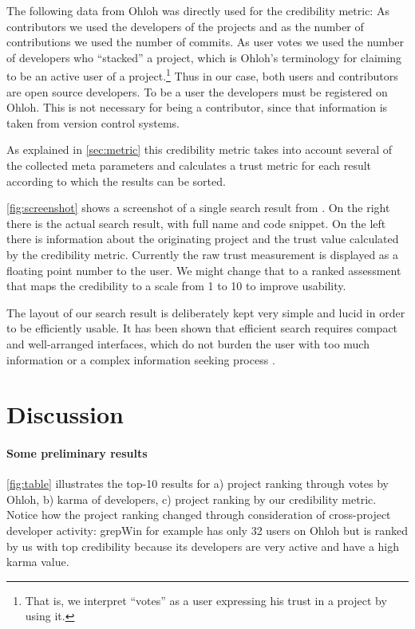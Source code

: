 The following data from Ohloh was directly used for the credibility metric: As contributors we used the developers of the projects and as the number of contributions we used the number of commits. As user votes we used the number of developers who ``stacked'' a project, which is Ohloh's terminology for claiming to be an active user of a project.\footnote{That is, we interpret ``votes'' as a user expressing his trust in a project by using it.} Thus in our case, both users and contributors are open source developers. To be a user the developers must be registered on Ohloh.  This is not necessary for being a contributor, since that information is taken from version control systems.

As explained in \autoref{sec:metric} this credibility metric takes into account several of the collected meta parameters and calculates a trust metric for each result according to which the results can be sorted.

\autoref{fig:screenshot} shows a screenshot of a single search result from \Jbd. On the right there is the actual search result, with full name and code snippet. On the left there is information about the originating project and the trust value calculated by the credibility metric. Currently the raw trust measurement is displayed as a floating point number to the user. We might change that to a ranked assessment that maps the credibility to a scale from 1 to 10 to improve usability. 

The layout of our search result is deliberately kept very simple and lucid in order to be efficiently usable. It has been shown that efficient search requires compact and well-arranged interfaces, which do not burden the user with too much information or a complex information seeking process \cite{Hear09a}. 


\section{Discussion}
\label{sec:discussion}

\paragraph{Some preliminary results}
\autoref{fig:table} illustrates the top-10 results for a) project ranking through votes by Ohloh, b) karma of developers, c) project ranking by our credibility metric. Notice how the project ranking changed through consideration of cross-project developer activity: grepWin for example has only 32 users on Ohloh but is ranked by us with top credibility because its developers are very active and have a high karma value.

